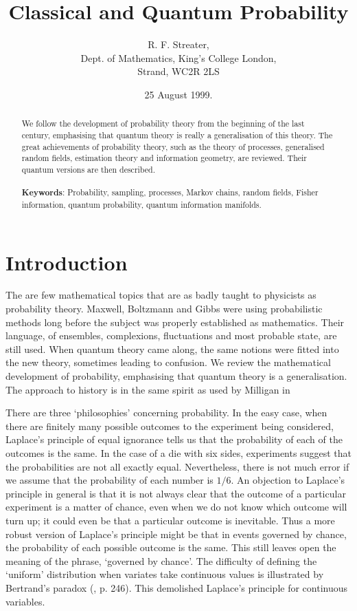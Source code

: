 \documentclass[12pt]{article}
\title{Classical and Quantum Probability}
\author{R. F. Streater,\\Dept. of Mathematics,
King's College London,\\ Strand, WC2R 2LS}
\date{25 August 1999.}
\begin{document}
\maketitle
\begin{abstract}
We follow the development of probability theory from the beginning
of the last century, emphasising that quantum theory is really a
generalisation of
this theory. The great achievements of probability theory, such as
the theory of processes, generalised random fields, estimation
theory and information geometry, are reviewed. Their quantum versions
are then described.\\
\\
{\bf Keywords}: Probability, sampling, processes, Markov chains, random fields,
Fisher information, quantum probability, quantum information manifolds.
\end{abstract}
\thispagestyle{empty}
\newpage

\section{Introduction}
The are few mathematical topics that are as badly taught to physicists
as probability theory. Maxwell, Boltzmann and Gibbs were using probabilistic
methods long before the subject was properly established as mathematics.
Their language, of ensembles,
complexions, fluctuations and most probable state, are still used. When
quantum theory came along, the same notions were fitted into the new theory,
sometimes leading to confusion. We review the mathematical development
of probability, emphasising that quantum theory is a generalisation. The
approach to history is in the same spirit as used by Milligan in
\cite{Milligan}

There are three `philosophies' concerning probability. 
In the easy case, when there are finitely many possible outcomes to the
experiment being considered, 
Laplace's principle of equal ignorance tells us
that the probability of each of the outcomes is the same. In the case of a
die with six sides, experiments suggest that the probabilities are not all
exactly equal. Nevertheless, there is
not much error if we assume that the probability of each number is $1/6$.
An objection to Laplace's principle in general is that it is
not always clear that the outcome of a particular experiment is a matter
of chance, even when we do not know which outcome
will turn up; it could even be that a particular outcome is inevitable. Thus
a more robust version of Laplace's principle might be that in events
governed by chance, the probability of each possible outcome is the same.
This still leaves open the meaning of the phrase, `governed by chance'.
The difficulty of defining the `uniform' distribution when variates take
continuous values is illustrated by Bertrand's paradox (\cite{Decker},
p. 246). This demolished Laplace's principle for continuous variables.
\end{document}

